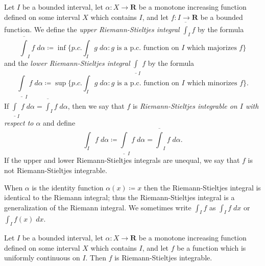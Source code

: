 \begin{definition}\label{11.8.11}
    Let \(I\) be a bounded interval, let \(\alpha : X \to \mathbf{R}\) be a monotone increasing function defined on some interval \(X\) which contains \(I\), and let \(f : I \to \mathbf{R}\) be a bounded function.
    We define the \emph{upper Riemann-Stieltjes integral} \(\overline{\int}_I f\) by the formula
    \[
        \overline{\int}_I f \; d \alpha \coloneqq \inf\{p.c. \int_I g \; d \alpha : g \text{ is a p.c. function on \(I\) which majorizes } f\}
    \]
    and the \emph{lower Riemann-Stieltjes integral} \(\underline{\int}_I f\) by the formula
    \[
        \underline{\int}_I f \; d \alpha \coloneqq \sup\{p.c. \int_I g \; d \alpha : g \text{ is a p.c. function on \(I\) which minorizes } f\}.
    \]
    If \(\underline{\int}_I f \; d \alpha = \overline{\int}_I f \; d \alpha\), then we say that \(f\) is \emph{Riemann-Stieltjes integrable on \(I\) with respect to \(\alpha\)} and define
    \[
        \int_I f \; d \alpha \coloneqq \underline{\int}_I f \; d \alpha = \overline{\int}_I f \; d \alpha.
    \]
    If the upper and lower Riemann-Stieltjes integrals are unequal, we say that \(f\) is not Riemann-Stieltjes integrable.
\end{definition}

\begin{note}
    When \(\alpha\) is the identity function \(\alpha(x) \coloneqq x\) then the Riemann-Stieltjes integral is identical to the Riemann integral;
    thus the Riemann-Stieltjes integral is a generalization of the Riemann integral.
    We sometimes write \(\int_I f\) as \(\int_I f \; dx\) or \(\int_I f(x) \; dx\).
\end{note}

\begin{theorem}\label{11.8.12}
    Let \(I\) be a bounded interval, let \(\alpha : X \to \mathbf{R}\) be a monotone increasing function defined on some interval \(X\) which contains \(I\), and let \(f\) be a function which is uniformly continuous on \(I\).
    Then \(f\) is Riemann-Stieltjes integrable.
\end{theorem}


